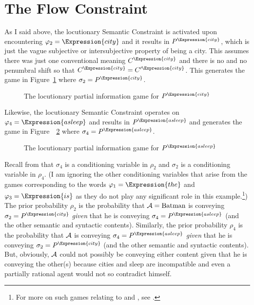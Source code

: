 \section{The Flow Constraint}

As I said above, the locutionary Semantic Constraint is activated upon encountering $\varphi_2 = \Expression{city}$ and it results in $P^\Expression{city}$, which is just the vague subjective or intersubjective property of being a city. This assumes there was just one conventional meaning $C^{\Expression{city}}$ and there is no  and no penumbral shift so that $C^{\Expression{city}} = C'^{\Expression{city}}$. This generates the game in Figure~\ref{fig:game corresponding to P^city} where $\sigma_2 = P^\Expression{city}$.

\begin{figure}[h] 
 
\caption{The locutionary partial information game for $P^\Expression{city}$}
\label{fig:game corresponding to P^city}
\end{figure}

Likewise, the locutionary Semantic Constraint operates on $\varphi_4 = \Expression{asleep}$ and results in $P^\Expression{asleep}$ and generates the game in Figure~~\ref{fig:game corresponding to P^asleep} where $\sigma_4 = P^\Expression{asleep}$.

\begin{figure}[h] 
 
\caption{The locutionary partial information game for $P^\Expression{asleep}$}
\label{fig:game corresponding to P^asleep}
\end{figure}

Recall from  that $\sigma_4$ is a conditioning variable in $\rho_2$ and $\sigma_2$ is a conditioning variable in $\rho_4$. (I am ignoring the other conditioning variables that arise from the games corresponding to the words $\varphi_1 = \Expression{the}$ and $\varphi_3 = \Expression{is}$ as they do not play any significant role in this example.\footnote{For more on such games relating to  and , see \citet[Chapter~6]{parikh:le}.}) The prior probability $\rho_2$ is the probability that ${\cal A} = \hbox{Batman}$ is conveying $\sigma_2 = P^\Expression{city}$ \emph{given} that he is conveying $\sigma_4 = P^\Expression{asleep}$ (and the other semantic and syntactic contents). Similarly, the prior probability $\rho_4$ is the probability that $\cal A$ is conveying $\sigma_4 = P^\Expression{asleep}$ \emph{given} that he is conveying $\sigma_2 = P^\Expression{city}$ (and the other semantic and syntactic contents). But, obviously, $\cal A$ could not possibly be conveying either content given that he is conveying the other(s) because cities and sleep are incompatible and even a partially rational agent would not so contradict himself. 

